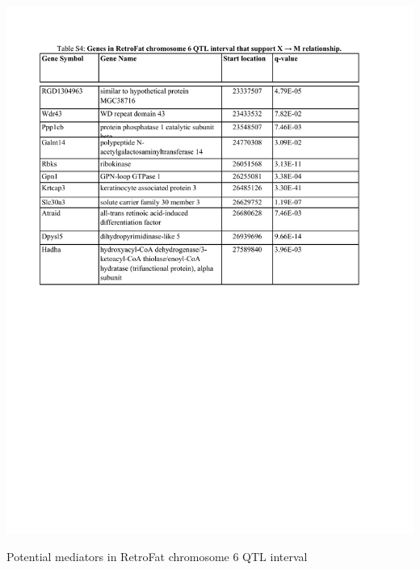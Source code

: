 \begin{table}
\centering
\includegraphics[page=1, trim={0in 5in 0in 0.95in}, clip, width=\textwidth]{figures/5-hsrats/supp_table_eqtl.pdf}
\caption{Potential mediators in RetroFat chromosome 6 QTL interval \label{tab:retrofat_chr6_potential_mediators}}
\end{table}

\clearpage

